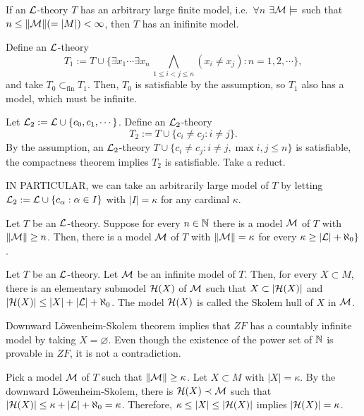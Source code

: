 \documentclass{../../small}
\begin{document}
\begin{ex*}
If an $\mathcal{L}$-theory $T$ has an arbitrary large finite model, i.e.~$\forall n$ $\exists\mathcal{M}\models$ such that $n\le\|\mathcal{M}\|(=|M|)<\infty$, then $T$ has an inifinite model.
\end{ex*}
\begin{pf}[Proof 1]
Define an $\mathcal{L}$-theory
\[T_1:=T\cup\{\exists x_1\cdots\exists x_n\,\bigwedge_{1\le i<j\le n}(x_i\ne x_j):n=1,2,\cdots\},\]
and take $T_0\subset_{\mathrm{fin}}T_1$.
Then, $T_0$ is satisfiable by the assumption, so $T_1$ also has a model, which must be infinite.
\end{pf}
\begin{pf}[Proof 2]
Let $\mathcal{L}_2:=\mathcal{L}\cup\{c_0,c_1,\cdots\}$.
Define an $\mathcal{L}_2$-theory
\[T_2:=T\cup\{c_i\ne c_j:i\ne j\}.\]
By the assumption, an $\mathcal{L}_2$-theory $T\cup\{c_i\ne c_j:i\ne j,\max{i,j}\le n\}$ is satisfiable, the compactness theorem implies $T_2$ is satisfiable.
Take a reduct.

IN PARTICULAR, we can take an arbitrarily large model of $T$ by letting $\mathcal{L}_2:=\mathcal{L}\cup\{c_\alpha:\alpha\in I\}$ with $|I|=\kappa$ for any cardinal $\kappa$.
\end{pf}

\begin{thm*}
Let $T$ be an $\mathcal{L}$-theory.
Suppose for every $n\in\mathbb{N}$ there is a model $\mathcal{M}$ of $T$ with $\|\mathcal{M}\|\ge n$.
Then, there is a model $\mathcal{M}$ of $T$ with $\|\mathcal{M}\|=\kappa$ for every $\kappa\ge|\mathcal{L}|+\aleph_0\}$.
\end{thm*}
\begin{thm*}
Let $T$ be an $\mathcal{L}$-theory.
Let $\mathcal{M}$ be an infinite model of $T$.
Then, for every $X\subset M$, there is an elementary submodel $\mathcal{H}(X)$ of $\mathcal{M}$ such that $X\subset|\mathcal{H}(X)|$ and $|\mathcal{H}(X)|\le|X|+|\mathcal{L}|+\aleph_0$.
The model $\mathcal{H}(X)$ is called the Skolem hull of $X$ in $\mathcal{M}$.
\end{thm*}

\begin{ex*}
Downward L\"owenheim-Skolem theorem implies that $ZF$ has a countably infinite model by taking $X=\varnothing$.
Even though the existence of the power set of $\mathbb{N}$ is provable in $ZF$, it is not a contradiction.
\end{ex*}

\begin{pf}
Pick a model $\mathcal{M}$ of $T$ such that $\|\mathcal{M}\|\ge\kappa$.
Let $X\subset M$ with $|X|=\kappa$.
By the downward L\"owenheim-Skolem, there is $\mathcal{H}(X)\prec\mathcal{M}$ such that $|\mathcal{H}(X)|\le\kappa+|\mathcal{L}|+\aleph_0=\kappa$.
Therefore, $\kappa\le|X|\le|\mathcal{H}(X)|$ implies $|\mathcal{H}(X)|=\kappa$.
\end{pf}
\end{document}
